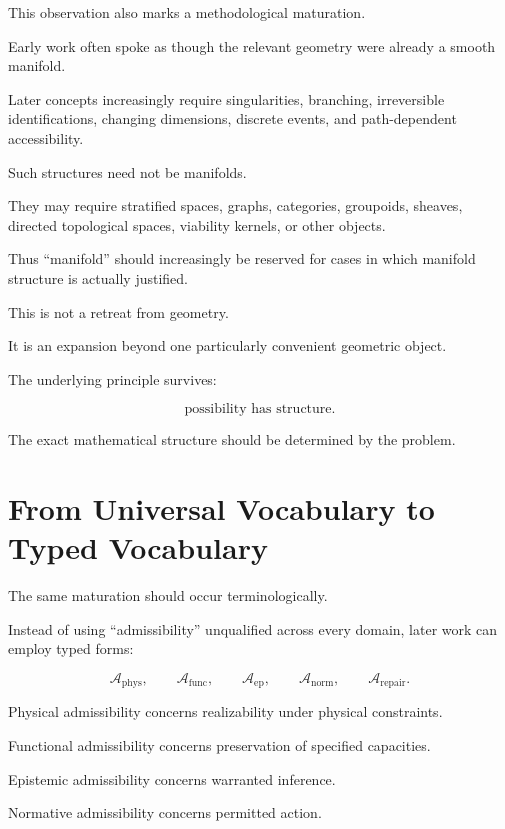 \documentclass[11pt]{article}
\theoremstyle{remark}
\newcommand{\Adm}{\mathcal{A}}
\begin{document}
This observation also marks a methodological maturation.

Early work often spoke as though the relevant geometry were already a smooth manifold.

Later concepts increasingly require singularities, branching, irreversible identifications, changing dimensions, discrete events, and path-dependent accessibility.

Such structures need not be manifolds.

They may require stratified spaces, graphs, categories, groupoids, sheaves, directed topological spaces, viability kernels, or other objects.

Thus ``manifold'' should increasingly be reserved for cases in which manifold structure is actually justified.

This is not a retreat from geometry.

It is an expansion beyond one particularly convenient geometric object.

The underlying principle survives:

\begin{equation}
\text{possibility has structure}.
\end{equation}

The exact mathematical structure should be determined by the problem.

\section{From Universal Vocabulary to Typed Vocabulary}

The same maturation should occur terminologically.

Instead of using ``admissibility'' unqualified across every domain, later work can employ typed forms:

\begin{equation}
\Adm_{\mathrm{phys}},
\qquad
\Adm_{\mathrm{func}},
\qquad
\Adm_{\mathrm{ep}},
\qquad
\Adm_{\mathrm{norm}},
\qquad
\Adm_{\mathrm{repair}}.
\end{equation}

Physical admissibility concerns realizability under physical constraints.

Functional admissibility concerns preservation of specified capacities.

Epistemic admissibility concerns warranted inference.

Normative admissibility concerns permitted action.
\end{document}
